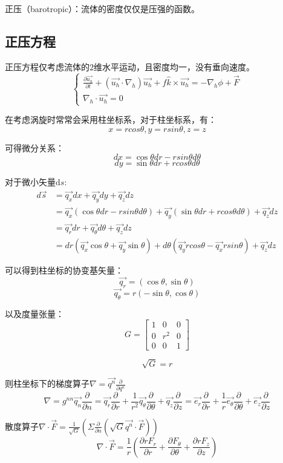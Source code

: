 \documentclass{article}
\begin{document}
正压（barotropic）：流体的密度仅仅是压强的函数。

\subsection{正压方程}
正压方程仅考虑流体的$2$维水平运动，且密度均一，没有垂向速度。
$$\begin{cases}
\frac{\partial \vec{u_h}}{\partial t}+(\vec{u_h}\cdot\nabla_h)\vec{u_h}+f\hat{k}\times\vec{u_h} = -\nabla_h \phi + \vec{F}\\
\nabla_h\cdot\vec{u_h} = 0
\end{cases}$$

在考虑涡旋时常常会采用柱坐标系，对于柱坐标系，有：
$$x=rcos\theta, y=rsin\theta,z=z$$

可得微分关系：
$$dx = \cos\theta dr - rsin\theta d\theta$$
$$dy = \sin\theta dr + rcos\theta d\theta$$

对于微小矢量$\text{d} s$:
\begin{align}
d\vec{s} &= \vec{q_x}dx + \vec{q_y}dy + \vec{q_z}dz \\ 
         &= \vec{q_x}(\cos\theta dr - rsin\theta d\theta) + \vec{q_y}(\sin\theta dr + rcos\theta d\theta) + \vec{q_z}dz \\
         &= \vec{q_r}dr + \vec{q_\theta}d\theta + \vec{q_z}dz\\
         &= dr(\vec{q_x}\cos\theta+\vec{q_y}\sin\theta) + d\theta(\vec{q_y}rcos\theta-\vec{q_x}rsin\theta)+\vec{q_z}dz
\end{align}

可以得到柱坐标的协变基矢量：
$$\vec{q_r} = (\cos\theta, \sin\theta)$$
$$\vec{q_\theta} = r(-\sin\theta, \cos\theta)$$

以及度量张量：
$$G=\begin{bmatrix}
    1&0&0 \\
    0&r^2&0 \\
    0&0&1
\end{bmatrix}$$

$$\sqrt{G} = r$$

则柱坐标下的梯度算子$\nabla = \vec{q^n}\frac{\partial}{\partial q^n}$
$$\nabla=g^{nn}\vec{q_n}\frac{\partial}{\partial n}=\vec{q_r}\frac{\partial}{\partial r}+\frac{1}{r^2}\vec{q_\theta}\frac{\partial}{\partial \theta}+\vec{q_z}\frac{\partial}{\partial z}=\vec{e_r}\frac{\partial}{\partial r}+\frac{1}{r}\vec{e_\theta}\frac{\partial}{\partial \theta}+\vec{e_z}\frac{\partial}{\partial z}$$

散度算子$\nabla\cdot\vec{F} = \frac{1}{\sqrt{G}}\left(\Sigma\frac{\partial}{\partial n}(\sqrt{G}\vec{q^n}\cdot\vec{F})\right)$
$$\nabla\cdot\vec{F}= \frac{1}{r}(\frac{\partial rF_r}{\partial r}+\frac{\partial F_\theta}{\partial \theta}+\frac{\partial rF_z}{\partial z})$$
\end{document}
